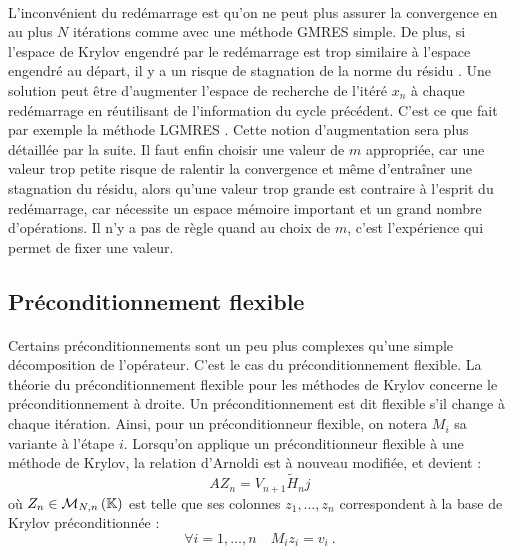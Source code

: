     \paragraph{}
    L’inconvénient du redémarrage est qu’on ne peut plus assurer la convergence en au plus $N$ itérations comme avec une méthode GMRES simple.
    De plus, si l'espace de Krylov engendré par le redémarrage est trop similaire à l'espace engendré au départ, il y a un risque de stagnation de la norme du résidu \cite{Simoncini1999}.
    Une solution peut être d'augmenter l'espace de recherche de l'itéré $x_n$ à chaque redémarrage en réutilisant de l'information du cycle précédent.
    C'est ce que fait par exemple la méthode LGMRES \cite{BakerJessupManteuffel2005}.
    Cette notion d'augmentation sera plus détaillée par la suite.
    Il faut enfin choisir une valeur de $m$ appropriée, car une valeur trop petite risque de ralentir la convergence et même d’entraîner une stagnation du résidu, alors qu'une valeur trop grande est contraire à l’esprit du redémarrage, car nécessite un espace mémoire important et un grand nombre d’opérations.
    Il n’y a pas de règle quand au choix de $m$, c’est l’expérience qui permet de fixer une valeur.


	\subsection{Préconditionnement flexible}

		\paragraph{}
		Certains préconditionnements sont un peu plus complexes qu'une simple décomposition de l'opérateur.
		C'est le cas du préconditionnement flexible.
    La théorie du préconditionnement flexible pour les méthodes de Krylov concerne le préconditionnement à droite.
		Un préconditionnement est dit flexible s'il change à chaque itération.
    Ainsi, pour un préconditionneur flexible, on notera $M_i$ sa variante à l'étape $i$.
    Lorsqu'on applique un préconditionneur flexible à une méthode de Krylov, la relation d'Arnoldi est à nouveau modifiée, et devient :
    \begin{equation}\label{eq:arnoldi_pre_flex}
      AZ_n = V_{n+1}\widetilde{H}_nj
    \end{equation}
    où $Z_n\in\mathcal{M}_{N, n}\left(\mathbb{K}\right)$ est telle que ses colonnes $z_1,\dots, z_n$ correspondent à la base de Krylov préconditionnée :
    \[\forall i = 1, \dots, n\quad M_iz_i = v_i\ .\]

